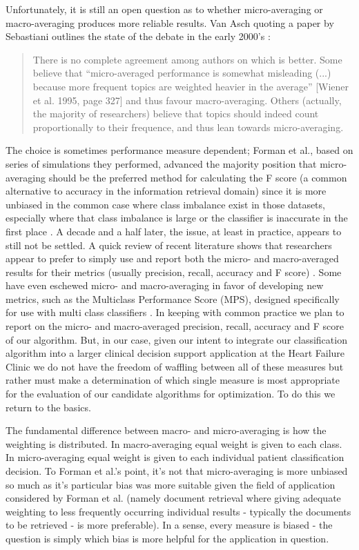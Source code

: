 \documentclass[]{article}
\begin{document}
Unfortunately, it is still an open question as to whether micro-averaging or macro-averaging produces more reliable results. Van Asch quoting a paper by Sebastiani outlines the state of the debate in the early 2000's \cite{VanAsch2013}:
\blockquote{There is no complete agreement among authors on which is  better. Some believe that  “micro-averaged performance is somewhat  misleading (...) because more frequent topics are weighted heavier in the average” [Wiener et	al. 1995, page 327] and thus favour macro-averaging.  Others (actually, the majority of researchers) believe that topics should indeed count proportionally to their frequence, and thus lean towards micro-averaging.\cite{Sebastiani2002}} The choice is sometimes performance measure dependent; Forman et al.\@, based on series of simulations they performed, advanced the majority position that micro-averaging should be the preferred method for calculating the F score (a common alternative to accuracy in the information retrieval domain) since it is more unbiased in the common case where class imbalance exist in those datasets, especially where that class imbalance is large or the classifier is inaccurate in the first place \cite{Forman2010}. A decade and a half later, the issue, at least in practice, appears to still not be settled. A quick review of recent literature shows that researchers appear to prefer to simply use and report both the micro- and macro-averaged results for their metrics (usually precision, recall, accuracy and F score) \cite{Rehman2017,Du2017,Kayaalp2017,Wang2014}. Some have even eschewed micro- and macro-averaging in favor of developing new metrics, such as the Multiclass Performance Score (MPS), designed specifically for use with multi class classifiers \cite{Kautz2017}. In keeping with common practice we plan to report on the micro- and macro-averaged precision, recall, accuracy and F score of our algorithm. But, in our case, given our intent to integrate our classification algorithm into a larger clinical decision support application at the Heart Failure Clinic we do not have the freedom of waffling between all of these measures but rather must make a determination of which single measure is most appropriate for the evaluation of our candidate algorithms for optimization. To do this we return to the basics.

The fundamental difference between macro- and micro-averaging is how the weighting is distributed. In macro-averaging equal weight is given to each class. In micro-averaging equal weight is given to each individual patient classification decision. To Forman et al.'s point, it's not that micro-averaging is more unbiased so much as it's particular bias was more suitable given the field of application considered by Forman et al. (namely document retrieval where giving adequate weighting to less frequently occurring individual results - typically the documents to be retrieved - is more preferable). In a sense, every measure is biased - the question is simply which bias is more helpful for the application in question. 
\end{document}
